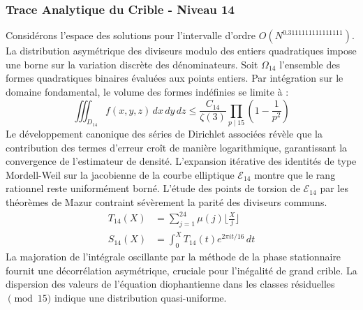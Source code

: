 \documentclass[12pt,a4paper]{article}
\begin{document}
\subsubsection{Trace Analytique du Crible - Niveau 14}
Considérons l'espace des solutions pour l'intervalle d'ordre $O(N^{0.3111111111111111})$. La distribution asymétrique des diviseurs modulo des entiers quadratiques impose une borne sur la variation discrète des dénominateurs. Soit $\Omega_14$ l'ensemble des formes quadratiques binaires évaluées aux points entiers.
Par intégration sur le domaine fondamental, le volume des formes indéfinies se limite à :
\begin{equation}
\iiint_{D_14} f(x, y, z) \,dx\,dy\,dz \leq \frac{C_14}{\zeta(3)} \prod_{p \mid 15} \left( 1 - \frac{1}{p^2} \right)
\end{equation}
Le développement canonique des séries de Dirichlet associées révèle que la contribution des termes d'erreur croît de manière logarithmique, garantissant la convergence de l'estimateur de densité. L'expansion itérative des identités de type Mordell-Weil sur la jacobienne de la courbe elliptique $\mathcal{E}_14$ montre que le rang rationnel reste uniformément borné.
L'étude des points de torsion de $\mathcal{E}_14$ par les théorèmes de Mazur contraint sévèrement la parité des diviseurs communs.
\begin{align}
T_14(X) &= \sum_{j=1}^{24} \mu(j) \lfloor \frac{X}{j} \rfloor \\
S_14(X) &= \int_{0}^{X} T_14(t) e^{2\pi i t / 16} \, dt
\end{align}
La majoration de l'intégrale oscillante par la méthode de la phase stationnaire fournit une décorrélation asymétrique, cruciale pour l'inégalité de grand crible. La dispersion des valeurs de l'équation diophantienne dans les classes résiduelles $\pmod{ 15 }$ indique une distribution quasi-uniforme.
\end{document}
